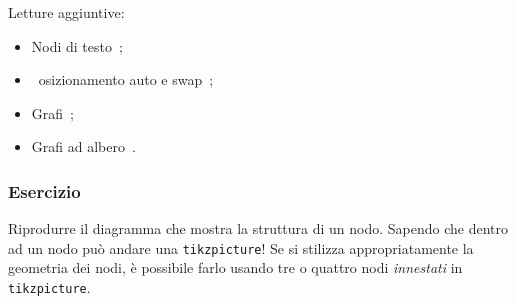 \documentclass{article}
\DeclareRobustCommand{\ExternalLink}{\faLink}
\DeclareRobustCommand{\riferimento}[1]{~\href{#1}{\ExternalLink}}
\newenvironment{giotikzpicture}[1][]{%
\begin{figure}[H]%
\centering%
\begin{framed}%
\begin{tikzpicture}[#1]%
}{%
\end{tikzpicture}%
\end{framed}%
\vspace*{-0.8em}%
\caption{}%
\end{figure}%
}
\begin{document}
Letture aggiuntive:
\begin{itemize}
\item Nodi di testo\riferimento{https://tikz.dev/tikz-shapes\#sec-17.4.3};
\item ~osizionamento auto e swap\riferimento{https://tikz.dev/tikz-shapes\#sec-17.8};
\item Grafi\riferimento{https://tikz.dev/tikz-graphs};
\item Grafi ad albero\riferimento{https://tikz.dev/tikz-trees}.
\end{itemize}









\subsubsection{Esercizio}

Riprodurre il diagramma che mostra la struttura di un nodo.
Sapendo che dentro ad un nodo può andare una \texttt{tikzpicture}!
Se si stilizza appropriatamente la geometria dei nodi, è possibile farlo usando tre o quattro nodi {\em innestati} in \texttt{tikzpicture}.
\end{document}
